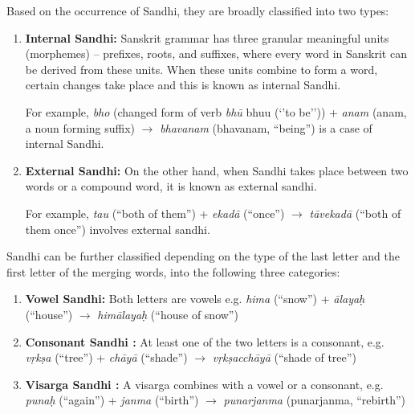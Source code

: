 \documentclass[11pt]{article}
\begin{document}
Based on the occurrence of Sandhi, they are broadly classified into two types:
\begin{enumerate}
	\item \textbf{Internal Sandhi:} Sanskrit grammar has three granular meaningful units (morphemes) – prefixes, roots, and suffixes, where every word in Sanskrit can be derived from these units. When these units combine to form a word, certain changes take place and this is known as internal Sandhi.
	
	For example, \textit{ bho} (changed form of verb \textit{bh\={u}} bhuu (‘’to be’’)) + \textit{anam} (anam, a noun forming suffix) $\rightarrow$ \textit{bhavanam }(bhavanam, “being”) is a case of internal Sandhi.
	
	\item \textbf{External Sandhi:}
	On the other hand, when Sandhi takes place between two words or a compound word, it is known as external sandhi. 
	
	For example,
	\textit{tau} (``both of them'') + \textit{ekad\={a}} (``once'') $\rightarrow$ \textit{t\={a}vekad\={a}} (``both of them once'') involves external sandhi.
	
\end{enumerate}

Sandhi can be further classified depending on the type of the last letter and the first letter of the merging words, into the following three categories:

\begin{enumerate}
	\item \textbf{Vowel Sandhi:} Both letters are vowels e.g. \textit{ hima} (``snow'') + \textit{ \={a}laya\d{h}} (``house'') $\rightarrow$ \textit{him\={a}laya\d{h}} (``house of snow'')
	\item \textbf{Consonant Sandhi :}  At least one of the two letters is a consonant, e.g. \textit{v\d{r}k\d{s}a} (``tree'') + \textit{ch\={a}y\={a} }(``shade'') $\rightarrow$ \textit{v\d{r}k\d{s}acch\={a}y\={a}} (``shade of tree'') 
	\item \textbf{Visarga Sandhi :} A visarga combines with a vowel or a consonant, e.g.  \textit{ puna\d{h} }(``again'') + \textit{janma }(``birth'') $\rightarrow$ \textit{punarjanma} (punarjanma, “rebirth”)
	
\end{enumerate}
\end{document}

